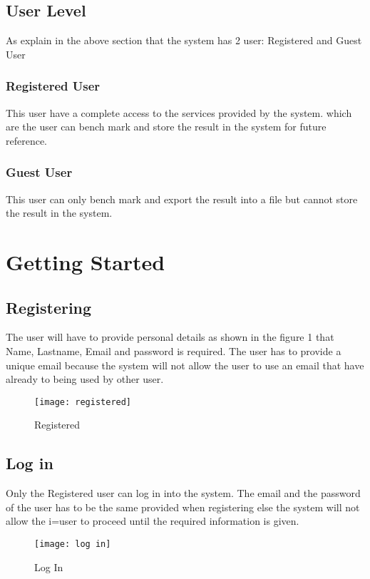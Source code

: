 \documentclass[runningheads,a4paper]{article}
\begin{document}
\subsection{User Level}
As explain in the above section that the system has 2 user: Registered and Guest User
\subsubsection{Registered User}
This user have a complete access to the services provided by the system. which are the user can bench mark and store the result in the system for future reference.
\subsubsection{Guest User}
This user can only bench mark and export the result into a file but cannot store the result in the system.
\section{Getting Started}

\subsection{Registering}
The user will have to provide personal details as shown in the figure 1 that Name, Lastname, Email and password is required. The user has to provide a unique email because the system will not allow the user to use an email that have already to being used by other user.\newline

\begin{figure}[htp]
\centering
\texttt{[image: registered]}
\caption{Registered}
\label{fig:lion}
\end{figure}

\subsection{Log in}
Only the Registered user can log in into the system. The email and the password of the user has to be the same provided when registering else the system will not allow the i=user to proceed until the required information is given.

\begin{figure}[ht]
\centering
\texttt{[image: log in]}
\caption{Log In}
\label{fig:lion}
\end{figure}
\end{document}
